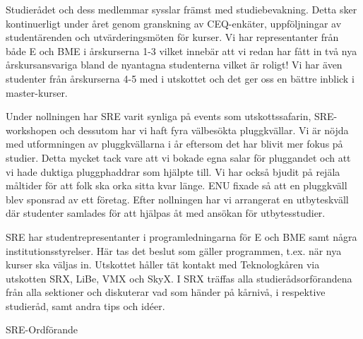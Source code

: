 \documentclass[../_main/handlingar.tex]{subfiles}
\begin{document}

Studierådet och dess medlemmar sysslar främst med studiebevakning. Detta sker kontinuerligt under året genom granskning av CEQ-enkäter, uppföljningar av studentärenden och utvärderingsmöten för kurser. Vi har representanter från både E och BME i årskurserna 1-3 vilket innebär att vi redan har fått in två nya årskursansvariga bland de nyantagna studenterna vilket är roligt! Vi har även studenter från årskurserna 4-5 med i utskottet och det ger oss en bättre inblick i master-kurser. 

Under nollningen har SRE varit synliga på events som utskottssafarin, SRE-workshopen och dessutom har vi haft fyra välbesökta pluggkvällar. Vi är nöjda med utformningen av pluggkvällarna i år eftersom det har blivit mer fokus på studier. Detta mycket tack vare att vi bokade egna salar för pluggandet och att vi hade duktiga pluggphaddrar som hjälpte till. Vi har också bjudit på rejäla måltider för att folk ska orka sitta kvar länge. ENU fixade så att en pluggkväll blev sponsrad av ett företag. Efter nollningen har vi arrangerat en utbyteskväll där studenter samlades för att hjälpas åt med ansökan för utbytesstudier. 

SRE har studentrepresentanter i programledningarna för E och BME samt några  institutionsstyrelser. Här tas det beslut som gäller programmen, t.ex. när nya kurser ska väljas in. Utskottet håller tät kontakt med Teknologkåren via utskotten SRX, LiBe, VMX och SkyX. I SRX träffas alla studierådsorförandena från alla sektioner och diskuterar vad som händer på kårnivå, i respektive studieråd, samt andra tips och idéer. 

\begin{signatures}{1}
    \mvh
    \signature{Fanny Månefjord}{SRE-Ordförande}
\end{signatures}
\end{document}
